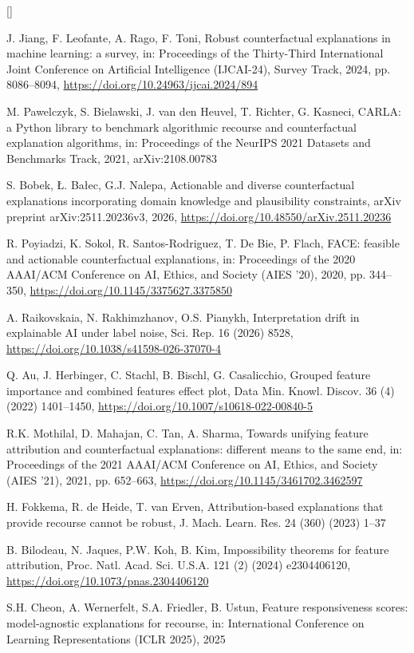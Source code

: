 \documentclass[9pt,a4paper]{extarticle}
\newcounter{refc}
\begin{document}
{\begin{list}{[]}{\setlength{\leftmargin}{2.2em}\setlength{\labelwidth}{2em}\setlength{\itemsep}{0.5pt}\setlength{\parsep}{0pt}}
\item J. Jiang, F. Leofante, A. Rago, F. Toni, Robust counterfactual explanations in machine learning: a survey, in: Proceedings of the Thirty-Third International Joint Conference on Artificial Intelligence (IJCAI-24), Survey Track, 2024, pp. 8086–8094, \url{https://doi.org/10.24963/ijcai.2024/894}
\item M. Pawelczyk, S. Bielawski, J. van den Heuvel, T. Richter, G. Kasneci, CARLA: a Python library to benchmark algorithmic recourse and counterfactual explanation algorithms, in: Proceedings of the NeurIPS 2021 Datasets and Benchmarks Track, 2021, arXiv:2108.00783
\item S. Bobek, Ł. Bałec, G.J. Nalepa, Actionable and diverse counterfactual explanations incorporating domain knowledge and plausibility constraints, arXiv preprint arXiv:2511.20236v3, 2026, \url{https://doi.org/10.48550/arXiv.2511.20236}
\item R. Poyiadzi, K. Sokol, R. Santos-Rodriguez, T. De Bie, P. Flach, FACE: feasible and actionable counterfactual explanations, in: Proceedings of the 2020 AAAI/ACM Conference on AI, Ethics, and Society (AIES ’20), 2020, pp. 344–350, \url{https://doi.org/10.1145/3375627.3375850}
\item A. Raikovskaia, N. Rakhimzhanov, O.S. Pianykh, Interpretation drift in explainable AI under label noise, Sci. Rep. 16 (2026) 8528, \url{https://doi.org/10.1038/s41598-026-37070-4}
\item Q. Au, J. Herbinger, C. Stachl, B. Bischl, G. Casalicchio, Grouped feature importance and combined features effect plot, Data Min. Knowl. Discov. 36 (4) (2022) 1401–1450, \url{https://doi.org/10.1007/s10618-022-00840-5}
\item R.K. Mothilal, D. Mahajan, C. Tan, A. Sharma, Towards unifying feature attribution and counterfactual explanations: different means to the same end, in: Proceedings of the 2021 AAAI/ACM Conference on AI, Ethics, and Society (AIES ’21), 2021, pp. 652–663, \url{https://doi.org/10.1145/3461702.3462597}
\item H. Fokkema, R. de Heide, T. van Erven, Attribution-based explanations that provide recourse cannot be robust, J. Mach. Learn. Res. 24 (360) (2023) 1–37
\item B. Bilodeau, N. Jaques, P.W. Koh, B. Kim, Impossibility theorems for feature attribution, Proc. Natl. Acad. Sci. U.S.A. 121 (2) (2024) e2304406120, \url{https://doi.org/10.1073/pnas.2304406120}
\item S.H. Cheon, A. Wernerfelt, S.A. Friedler, B. Ustun, Feature responsiveness scores: model-agnostic explanations for recourse, in: International Conference on Learning Representations (ICLR 2025), 2025

\end{list}}
\end{document}
